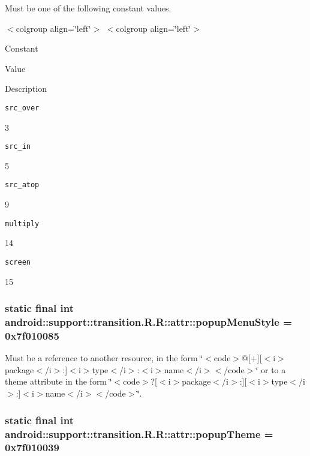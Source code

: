 Must be one of the following constant values. \begin{TabularC}{0}
\hline
\end{TabularC}
$<$colgroup align=\char`\"{}left\char`\"{}$>$ $<$colgroup align=\char`\"{}left\char`\"{}$>$ 

Constant

Value

Description 

{\tt src\_\-over}

3

{\tt src\_\-in}

5

{\tt src\_\-atop}

9

{\tt multiply}

14

{\tt screen}

15\hypertarget{classandroid_1_1support_1_1transition_1_1_r_1_1attr_e1cddd669615e76e0867b82db8782555}{
\subsubsection[{popupMenuStyle}]{\setlength{\rightskip}{0pt plus 5cm}static final int android::support::transition.R.R::attr::popupMenuStyle = 0x7f010085}}
\label{classandroid_1_1support_1_1transition_1_1_r_1_1attr_e1cddd669615e76e0867b82db8782555}


Must be a reference to another resource, in the form \char`\"{}$<$code$>$@\mbox{[}+\mbox{]}\mbox{[}$<$i$>$package$<$/i$>$:\mbox{]}$<$i$>$type$<$/i$>$:$<$i$>$name$<$/i$>$$<$/code$>$\char`\"{} or to a theme attribute in the form \char`\"{}$<$code$>$?\mbox{[}$<$i$>$package$<$/i$>$:\mbox{]}\mbox{[}$<$i$>$type$<$/i$>$:\mbox{]}$<$i$>$name$<$/i$>$$<$/code$>$\char`\"{}. \hypertarget{classandroid_1_1support_1_1transition_1_1_r_1_1attr_b4affcc5259192610dfb7f7920de5d6b}{
\subsubsection[{popupTheme}]{\setlength{\rightskip}{0pt plus 5cm}static final int android::support::transition.R.R::attr::popupTheme = 0x7f010039}}
\label{classandroid_1_1support_1_1transition_1_1_r_1_1attr_b4affcc5259192610dfb7f7920de5d6b}


